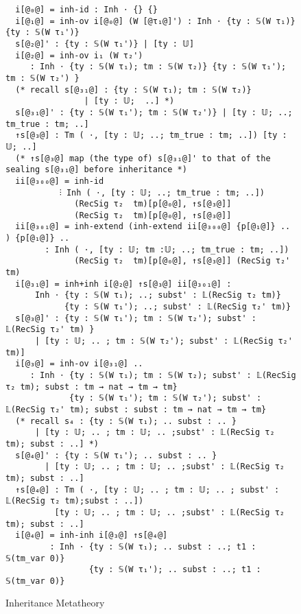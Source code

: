 \begin{figure}[!htb]
\begin{minipage}{\textwidth}
\begin{multicols}{3}
\begin{lstlisting}
  i[@₀@] = inh-id : Inh ⋅ {} {} 
  i[@₁@] = inh-ov i[@₀@] (W [@τ₁@]') : Inh ⋅ {ty : 𝕊(W τ₁)} {ty : 𝕊(W τ₁')}
  s[@₂@]' : {ty : 𝕊(W τ₁')} | [ty : 𝕌] 
  i[@₂@] = inh-ov i₁ (W τ₂') 
     : Inh ⋅ {ty : 𝕊(W τ₁); tm : 𝕊(W τ₂)} {ty : 𝕊(W τ₁'); tm : 𝕊(W τ₂') }
  (* recall s[@₃₁@] : {ty : 𝕊(W τ₁); tm : 𝕊(W τ₂)} 
                | [ty : 𝕌;  ..] *)
  s[@₃₁@]' : {ty : 𝕊(W τ₁'); tm : 𝕊(W τ₂')} | [ty : 𝕌; ..; tm_true : tm; ..]
  ↑s[@₃@] : Tm ( ⋅, [ty : 𝕌; ..; tm_true : tm; ..]) [ty : 𝕌; ..] 
  (* ↑s[@₃@] map (the type of) s[@₃₁@]' to that of the sealing s[@₃₁@] before inheritance *)
  ii[@₃₀₀@] = inh-id 
           ⫶ Inh ( ⋅, [ty : 𝕌; ..; tm_true : tm; ..])
              (RecSig τ₂  tm)[p[@₀@], ↑s[@₃@]]
              (RecSig τ₂  tm)[p[@₀@], ↑s[@₃@]]
  ii[@₃₀₁@] = inh-extend (inh-extend ii[@₃₀₀@] {p[@₁@]} .. ) {p[@₁@]} ..
        : Inh ( ⋅, [ty : 𝕌; tm :𝕌; ..; tm_true : tm; ..]) 
              (RecSig τ₂  tm)[p[@₀@], ↑s[@₃@]] (RecSig τ₂'  tm)
  i[@₃₁@] = inh+inh i[@₂@] ↑s[@₃@] ii[@₃₀₁@] : 
      Inh ⋅ {ty : 𝕊(W τ₁); ..; subst' : 𝕃(RecSig τ₂ tm)} 
            {ty : 𝕊(W τ₁'); ..; subst' : 𝕃(RecSig τ₂' tm)}
  s[@₃@]' : {ty : 𝕊(W τ₁'); tm : 𝕊(W τ₂'); subst' : 𝕃(RecSig τ₂' tm) }
      | [ty : 𝕌; .. ; tm : 𝕊(W τ₂'); subst' : 𝕃(RecSig τ₂' tm)] 
  i[@₃@] = inh-ov i[@₃₁@] ..
     : Inh ⋅ {ty : 𝕊(W τ₁); tm : 𝕊(W τ₂); subst' : 𝕃(RecSig τ₂ tm); subst : tm → nat → tm → tm}  
             {ty : 𝕊(W τ₁'); tm : 𝕊(W τ₂'); subst' : 𝕃(RecSig τ₂' tm); subst : subst : tm → nat → tm → tm}
  (* recall s₄ : {ty : 𝕊(W τ₁); .. subst : .. } 
      | [ty : 𝕌; .. ; tm : 𝕌; .. ;subst' : 𝕃(RecSig τ₂ tm); subst : ..] *)
  s[@₄@]' : {ty : 𝕊(W τ₁'); .. subst : .. } 
        | [ty : 𝕌; .. ; tm : 𝕌; .. ;subst' : 𝕃(RecSig τ₂ tm); subst : ..]
  ↑s[@₄@] : Tm ( ⋅, [ty : 𝕌; .. ; tm : 𝕌; .. ; subst' : 𝕃(RecSig τ₂ tm);subst : ..]) 
          [ty : 𝕌; .. ; tm : 𝕌; .. ;subst' : 𝕃(RecSig τ₂ tm); subst : ..]
  i[@₄@] = inh-inh i[@₃@] ↑s[@₄@] 
         : Inh ⋅ {ty : 𝕊(W τ₁); .. subst : ..; t1 : 𝕊(tm_var 0)} 
                 {ty : 𝕊(W τ₁'); .. subst : ..; t1 : 𝕊(tm_var 0)} 
  \end{lstlisting}
  
  \columnbreak
  

  
  \end{multicols}
  \end{minipage}
  \caption{Inheritance Metatheory}\label{fig:inheritance}
  \end{figure}

\fi